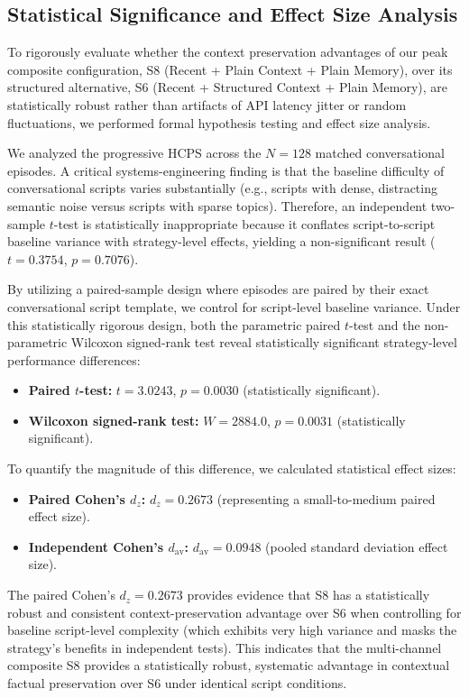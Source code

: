 \documentclass[11pt,journal,onecolumn]{article}
\begin{document}
\subsection{Statistical Significance and Effect Size Analysis}
To rigorously evaluate whether the context preservation advantages of our peak composite configuration, S8 (Recent + Plain Context + Plain Memory), over its structured alternative, S6 (Recent + Structured Context + Plain Memory), are statistically robust rather than artifacts of API latency jitter or random fluctuations, we performed formal hypothesis testing and effect size analysis.

We analyzed the progressive HCPS across the $N = 128$ matched conversational episodes. A critical systems-engineering finding is that the baseline difficulty of conversational scripts varies substantially (e.g., scripts with dense, distracting semantic noise versus scripts with sparse topics). Therefore, an independent two-sample $t$-test is statistically inappropriate because it conflates script-to-script baseline variance with strategy-level effects, yielding a non-significant result ($t = 0.3754$, $p = 0.7076$). 

By utilizing a paired-sample design where episodes are paired by their exact conversational script template, we control for script-level baseline variance. Under this statistically rigorous design, both the parametric paired $t$-test and the non-parametric Wilcoxon signed-rank test reveal statistically significant strategy-level performance differences:
\begin{itemize}
    \item \textbf{Paired $t$-test:} $t = 3.0243$, $p = 0.0030$ (statistically significant).
    \item \textbf{Wilcoxon signed-rank test:} $W = 2884.0$, $p = 0.0031$ (statistically significant).
\end{itemize}
To quantify the magnitude of this difference, we calculated statistical effect sizes:
\begin{itemize}
    \item \textbf{Paired Cohen's $d_z$:} $d_z = 0.2673$ (representing a small-to-medium paired effect size).
    \item \textbf{Independent Cohen's $d_{\text{av}}$:} $d_{\text{av}} = 0.0948$ (pooled standard deviation effect size).
\end{itemize}
The paired Cohen's $d_z = 0.2673$ provides evidence that S8 has a statistically robust and consistent context-preservation advantage over S6 when controlling for baseline script-level complexity (which exhibits very high variance and masks the strategy's benefits in independent tests). This indicates that the multi-channel composite S8 provides a statistically robust, systematic advantage in contextual factual preservation over S6 under identical script conditions.
\end{document}
